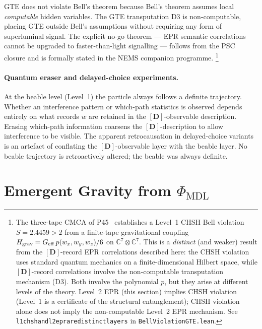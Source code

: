 \documentclass[11pt]{article}
\theoremstyle{remark}
\newcommand{\PHIMDL}{\Phi_{\mathrm{MDL}}}
\newcommand{\lean}[1]{%
  \penalty-100
  \begingroup\def\_{\textunderscore\allowbreak}\texttt{#1}\endgroup}
\begin{document}
GTE does not violate Bell's theorem because Bell's theorem assumes local
\emph{computable} hidden variables.  The GTE transputation D3 is
non-computable, placing GTE outside Bell's assumptions without requiring
any form of superluminal signal.
The explicit no-go theorem --- EPR semantic correlations cannot be upgraded
to faster-than-light signalling --- follows from the PSC closure and is
formally stated in the NEMS companion programme.
\footnote{The three-tape CMCA of P45~\cite{SpivackThreeTapeCMCA} establishes
a Level~1 CHSH Bell violation $S = 2.4459 > 2$ from a finite-tape gravitational
coupling $H_{\rm grav} = G_{\rm eff}\,p(w_x,w_y,w_z)/6$ on $\mathbb{C}^7\otimes\mathbb{C}^7$.
This is a \emph{distinct} (and weaker) result from the $[\mathbf{D}]$-record EPR correlations
described here: the CHSH violation uses standard quantum mechanics on a finite-dimensional
Hilbert space, while $[\mathbf{D}]$-record correlations involve the non-computable
transputation mechanism (D3).  Both involve the polynomial $p$, but they arise at
different levels of the theory.  Level~2 EPR (this section) implies CHSH violation
(Level~1 is a certificate of the structural entanglement); CHSH violation alone does not
imply the non-computable Level~2 EPR mechanism.
See \lean{l1\_chsh\_and\_l2\_epr\_are\_distinct\_layers} in \lean{BellViolationGTE.lean}.}

\paragraph{Quantum eraser and delayed-choice experiments.}
At the beable level (Level~1) the particle always follows a definite
trajectory.  Whether an interference pattern or which-path statistics is
observed depends entirely on what records $w$ are retained in the
$[\mathbf{D}]$-observable description.  Erasing which-path information coarsens
the $[\mathbf{D}]$-description to allow interference to be visible.  The apparent
retrocausation in delayed-choice variants is an artefact of conflating the
$[\mathbf{D}]$-observable layer with the beable layer.  No beable trajectory
is retroactively altered; the beable was always definite.

\section{Emergent Gravity from \texorpdfstring{$\PHIMDL$}{Phi-MDL}}
\label{sec:gravity}
\end{document}
